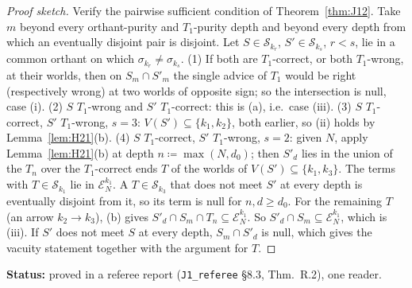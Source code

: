 \documentclass[11pt]{article}
\theoremstyle{definition}
\theoremstyle{remark}
\newcommand{\src}[1]{\texttt{#1}}
\newcommand{\status}[1]{\par\smallskip\noindent\textbf{Status:} #1\par\smallskip}
\begin{document}
\begin{proof}[Proof sketch]
Verify the pairwise sufficient condition of Theorem~\ref{thm:J12}. Take $m$ beyond every orthant-purity and $T_1$-purity depth and beyond every depth from which an eventually disjoint pair is disjoint. Let $S\in\mathcal S_{k_r}$, $S'\in\mathcal S_{k_s}$, $r<s$, lie in a common orthant on which $\sigma_{k_r}\ne\sigma_{k_s}$. (1) If both are $T_1$-correct, or both $T_1$-wrong, at their worlds, then on $S_m\cap S'_m$ the single advice of $T_1$ would be right (respectively wrong) at two worlds of opposite sign; so the intersection is null, case (i). (2) $S$ $T_1$-wrong and $S'$ $T_1$-correct: this is (a), i.e.\ case (iii). (3) $S$ $T_1$-correct, $S'$ $T_1$-wrong, $s=3$: $V(S')\subseteq\{k_1,k_2\}$, both earlier, so (ii) holds by Lemma~\ref{lem:H21}(b). (4) $S$ $T_1$-correct, $S'$ $T_1$-wrong, $s=2$: given $N$, apply Lemma~\ref{lem:H21}(b) at depth $n\coloneqq\max(N,d_0)$; then $S'_d$ lies in the union of the $T_n$ over the $T_1$-correct ends $T$ of the worlds of $V(S')\subseteq\{k_1,k_3\}$. The terms with $T\in\mathcal S_{k_1}$ lie in $\mathcal E^{k_1}_N$. A $T\in\mathcal S_{k_3}$ that does not meet $S'$ at every depth is eventually disjoint from it, so its term is null for $n,d\ge d_0$. For the remaining $T$ (an arrow $k_2\to k_3$), (b) gives $S'_d\cap S_m\cap T_n\subseteq\mathcal E^{k_1}_N$. So $S'_d\cap S_m\subseteq\mathcal E^{k_1}_N$, which is (iii). If $S'$ does not meet $S$ at every depth, $S_m\cap S'_d$ is null, which gives the vacuity statement together with the argument for $T$.
\end{proof}
\status{proved in a referee report (\src{J1\_referee} \S8.3, Thm.~R.2), one reader.}
\end{document}
